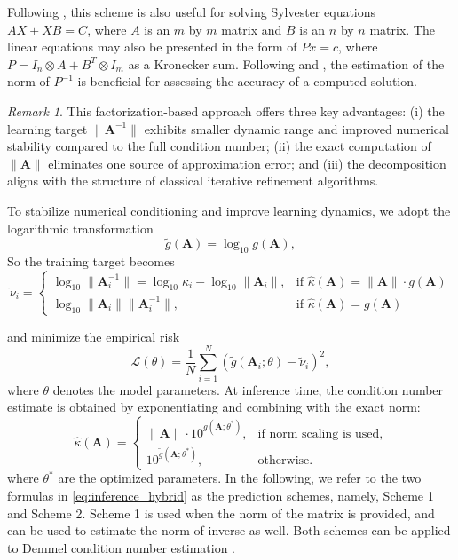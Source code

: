 \documentclass[11pt,a4paper]{article}
\theoremstyle{plain}
\theoremstyle{definition}
\theoremstyle{remark}
\newtheorem{remark}{Remark}
\begin{document}
Following \cite{10.1145/63522.214391}, this scheme is also useful for solving Sylvester equations $AX + XB = C$, where $A$ is an $m$ by $m$ matrix and $ B$ is an $n$ by $n$ matrix. The linear equations may also be presented in the form of $Px = c$, where $P =I_n  \otimes  A + B^T  \otimes  I_m$ as a Kronecker sum. Following \cite{1102170} and \cite{10.1093/imanum/2.3.303}, the estimation of the norm of $P^{-1}$ is beneficial for assessing the accuracy of a computed solution.  


\begin{remark}
This factorization-based approach offers three key advantages: (i) the learning target $\|\mathbf{A}^{-1}\|$ exhibits smaller dynamic range and improved numerical stability compared to the full condition number; (ii) the exact computation of $\|\mathbf{A}\|$ eliminates one source of approximation error; and (iii) the decomposition aligns with the structure of classical iterative refinement algorithms.
\end{remark}

To stabilize numerical conditioning and improve learning dynamics, we adopt the logarithmic transformation
\begin{equation}
\tilde{g}(\mathbf{A}) = \log_{10} g(\mathbf{A}),
\label{eq:log_transform_hybrid}
\end{equation}
So the training target becomes 
\begin{equation*}
\tilde{\nu}_i =
\begin{cases} 
\log_{10} \|\mathbf{A}_i^{-1}\| = \log_{10} \kappa_i - \log_{10} \|\mathbf{A}_i\|, & \text{if } \hat{\kappa}(\mathbf{A}) = \|\mathbf{A}\| \cdot g(\mathbf{A}) \\[2mm]
\log_{10} \|\mathbf{A}_i\| \|\mathbf{A}_i^{-1}\|, & \text{if } \hat{\kappa}(\mathbf{A}) = g(\mathbf{A})
\end{cases}
\end{equation*}

and minimize the empirical risk
\begin{equation}\label{eq:loss_hybrid}
\mathcal{L}(\theta) = \frac{1}{N} \sum_{i=1}^N \left( \tilde{g}(\mathbf{A}_i; \theta) - \tilde{\nu}_i \right)^2,
\end{equation}
where $\theta$ denotes the model parameters. At inference time, the condition number estimate is obtained by exponentiating and combining with the exact norm:
\begin{equation}
\label{eq:inference_hybrid}
\hat{\kappa}(\mathbf{A}) =
\begin{cases}
\|\mathbf{A}\| \cdot 10^{\tilde{g}(\mathbf{A}; \theta^*)}, & \text{if norm scaling is used}, \\[4pt]
10^{\tilde{g}(\mathbf{A}; \theta^*)}, & \text{otherwise}.
\end{cases}
\end{equation}
where $\theta^*$ are the optimized parameters. In the following, we refer to the two formulas in \eqref{eq:inference_hybrid} as the prediction schemes, namely, Scheme 1 and Scheme 2. Scheme 1 is used when the norm of the matrix is provided,  and can be used to estimate the norm of inverse as well. Both schemes can be applied to Demmel condition number estimation \cite{Demmel1987ConditionNumbers}. 
\end{document}
